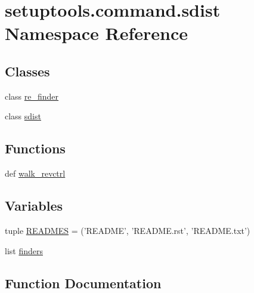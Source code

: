 \hypertarget{namespacesetuptools_1_1command_1_1sdist}{}\section{setuptools.\+command.\+sdist Namespace Reference}
\label{namespacesetuptools_1_1command_1_1sdist}
\subsection*{Classes}
\begin{DoxyCompactItemize}
\item 
class \hyperlink{classsetuptools_1_1command_1_1sdist_1_1re__finder}{re\+\_\+finder}
\item 
class \hyperlink{classsetuptools_1_1command_1_1sdist_1_1sdist}{sdist}
\end{DoxyCompactItemize}
\subsection*{Functions}
\begin{DoxyCompactItemize}
\item 
def \hyperlink{namespacesetuptools_1_1command_1_1sdist_a5181e2c349e8e72524cb45c37fb5a68f}{walk\+\_\+revctrl}
\end{DoxyCompactItemize}
\subsection*{Variables}
\begin{DoxyCompactItemize}
\item 
tuple \hyperlink{namespacesetuptools_1_1command_1_1sdist_aaaf1fe564241c345b67f453cf7eec42e}{R\+E\+A\+D\+M\+E\+S} = ('R\+E\+A\+D\+M\+E', 'R\+E\+A\+D\+M\+E.\+rst', 'R\+E\+A\+D\+M\+E.\+txt')
\item 
list \hyperlink{namespacesetuptools_1_1command_1_1sdist_a7fb0d7e57da7c47a186e684ebc4a93ba}{finders}
\end{DoxyCompactItemize}


\subsection{Function Documentation}
\hypertarget{namespacesetuptools_1_1command_1_1sdist_a5181e2c349e8e72524cb45c37fb5a68f}{}
